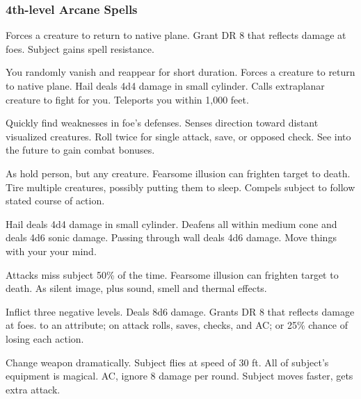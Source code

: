 \subsubsection{4th-level Arcane Spells} 
\begin{swspelllist}
     Forces a creature to return to native plane.
    \spellhead{}
     Grant DR 8 that reflects damage at foes.
     Subject gains spell resistance.

     You randomly vanish and reappear for short duration.
     Forces a creature to return to native plane.
     Hail deals 4d4 damage in small cylinder.
     Calls extraplanar creature to fight for you.
     Teleports you within 1,000 feet.

     Quickly find weaknesses in foe's defenses.
     Senses direction toward distant visualized creatures.
     Roll twice for single attack, save, or opposed check.
     See into the future to gain combat bonuses.

     As hold person, but any creature.
     Fearsome illusion can frighten target to death.
     Tire multiple creatures, possibly putting them to sleep.
     Compels subject to follow stated course of action.

     Hail deals 4d4 damage in small cylinder.
     Deafens all within medium cone and deals 4d6 sonic damage.
     Passing through wall deals 4d6 damage.
     Move things with your your mind.

     Attacks miss subject 50\% of the time.
     Fearsome illusion can frighten target to death.
    \spellhead{}
     As silent image, plus sound, smell and thermal effects.

     Inflict three negative levels.
     Deals 8d6 damage.
     Grants DR 8 that reflects damage at foes.
      to an attribute;  on attack rolls, saves, checks, and AC; or 25\% chance of losing each action.

     Change weapon dramatically.
     Subject flies at speed of 30 ft.
     All of subject's equipment is magical.
      AC, ignore 8 damage per round.
     Subject moves faster, gets extra attack.
\end{swspelllist}

